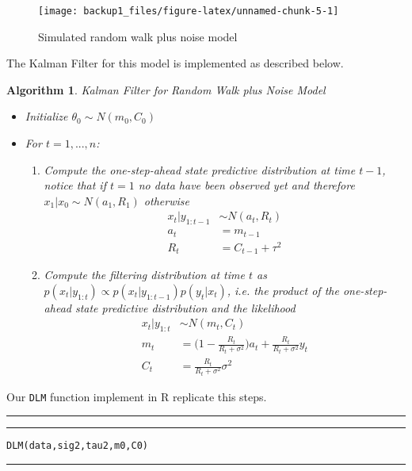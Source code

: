 \documentclass[
]{book}
\theoremstyle{break}
\theoremstyle{nonumberplain}
\newtheorem{algorithm}{Algorithm}[section]
\begin{document}
\begin{figure}[H]

{\centering \texttt{[image: backup1\_files/figure-latex/unnamed-chunk-5-1]} 

}

\caption{Simulated random walk plus noise model}\label{fig:unnamed-chunk-5}
\end{figure}

The Kalman Filter for this model is implemented as described below.

\begin{algorithm} Kalman Filter for Random Walk plus Noise Model
\begin{itemize}
\item Initialize $\theta_{0} \sim N(m_{0},C_{0})$
\item For $t=1,...,n$:
\begin{enumerate}
\item Compute the one-step-ahead state predictive distribution at time $t-1$, notice that if $t=1$ no data have been observed yet and therefore $x_{1}|x_{0}\sim N(a_{1},R_{1})$ otherwise
\begin{align*}
x_{t}|y_{1:t-1} & \sim N(a_{t},R_{t})\\
a_{t} & = m_{t-1}\\
R_{t} & = C_{t-1}+\tau^2
\end{align*}
\item Compute the filtering distribution at time $t$ as $p(x_{t}|y_{1:t}) \propto p(x_{t}|y_{1:t-1})p(y_{t}|x_{t})$, i.e. the product of the one-step-ahead state predictive distribution and the likelihood
\begin{align*}
x_{t}|y_{1:t} & \sim N(m_{t},C_{t}) \\
m_{t} & = \big(1-\frac{R_{t}}{R_{t}+\sigma^2}\big)a_{t}+\frac{R_{t}}{R_{t}+\sigma^2}y_{t} \\
C_{t} & = \frac{R_{t}}{R_{t}+\sigma^2}\sigma^2
\end{align*}
\end{enumerate}
\end{itemize}
\end{algorithm}

Our \texttt{DLM} function implement in R replicate this steps.\\

\hrule
\hrule

\hfill\break
\texttt{DLM(data,sig2,tau2,m0,C0)}\\

\hrule
\end{document}
